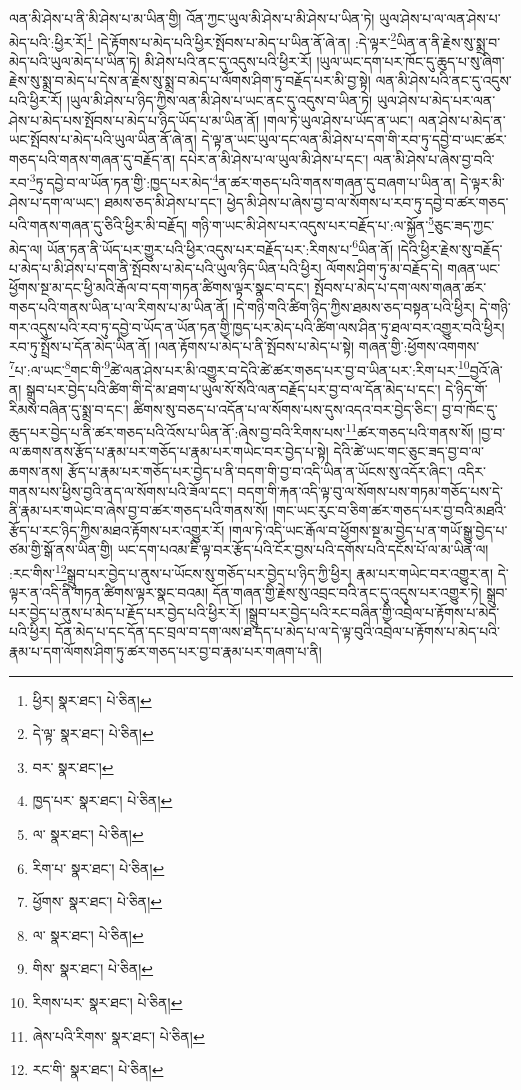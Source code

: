 ལན་མི་ཤེས་པ་ནི་མི་ཤེས་པ་མ་ཡིན་གྱི། འོན་ཀྱང་ཡུལ་མི་ཤེས་པ་མི་ཤེས་པ་ཡིན་ཏེ། ཡུལ་ཤེས་པ་ལ་ལན་ཤེས་པ་མེད་པའི་:ཕྱིར་རོ།\footnote{ཕྱིར།  སྣར་ཐང་།  པེ་ཅིན། } །དེ་རྟོགས་པ་མེད་པའི་ཕྱིར་སྤོབས་པ་མེད་པ་ཡིན་ནོ་ཞེ་ན། :དེ་ལྟར་\footnote{དེ་ལྟ་  སྣར་ཐང་།  པེ་ཅིན། }ཡིན་ན་ནི་རྗེས་སུ་སྨྲ་བ་མེད་པའི་ཡུལ་མེད་པ་ཡིན་ཏེ། མི་ཤེས་པའི་ནང་དུ་འདུས་པའི་ཕྱིར་རོ། །ཡུལ་ཡང་དག་པར་ཁོང་དུ་ཆུད་པ་སུ་ཞིག་རྗེས་སུ་སྨྲ་བ་མེད་པ་དེས་ན་རྗེས་སུ་སྨྲ་བ་མེད་པ་ལོགས་ཤིག་ཏུ་བརྗོད་པར་མི་བྱ་སྟེ། ལན་མི་ཤེས་པའི་ནང་དུ་འདུས་པའི་ཕྱིར་རོ། །ཡུལ་མི་ཤེས་པ་ཉིད་ཀྱིས་ལན་མི་ཤེས་པ་ཡང་ནང་དུ་འདུས་བ་ཡིན་ཏེ། ཡུལ་ཤེས་པ་མེད་པར་ལན་ཤེས་པ་མེད་པས་སྤོབས་པ་མེད་པ་ཉིད་ཡོད་པ་མ་ཡིན་ནོ། །གལ་ཏེ་ཡུལ་ཤེས་པ་ཡོད་ན་ཡང་། ལན་ཤེས་པ་མེད་ན་ཡང་སྤོབས་པ་མེད་པའི་ཡུལ་ཡིན་ནོ་ཞེ་ན། དེ་ལྟ་ན་ཡང་ཡུལ་དང་ལན་མི་ཤེས་པ་དག་གི་རབ་ཏུ་དབྱེ་བ་ཡང་ཚར་གཅད་པའི་གནས་གཞན་དུ་བརྗོད་ན། དཔེར་ན་མི་ཤེས་པ་ལ་ཡུལ་མི་ཤེས་པ་དང་། ལན་མི་ཤེས་པ་ཞེས་བྱ་བའི་རབ་\footnote{བར་  སྣར་ཐང་། }ཏུ་དབྱེ་བ་ལ་ཡོན་ཏན་གྱི་:ཁྱད་པར་མེད་\footnote{ཁྱད་པར་  སྣར་ཐང་།  པེ་ཅིན། }ན་ཚར་གཅད་པའི་གནས་གཞན་དུ་བཞག་པ་ཡིན་ན། དེ་ལྟར་མི་ཤེས་པ་དག་ལ་ཡང་། ཐམས་ཅད་མི་ཤེས་པ་དང་། ཕྱེད་མི་ཤེས་པ་ཞེས་བྱ་བ་ལ་སོགས་པ་རབ་ཏུ་དབྱེ་བ་ཚར་གཅད་པའི་གནས་གཞན་དུ་ཅིའི་ཕྱིར་མི་བརྗོད། གཉི་ག་ཡང་མི་ཤེས་པར་འདུས་པར་བརྗོད་པ་:ལ་སྐྱོན་\footnote{ལ་  སྣར་ཐང་།  པེ་ཅིན། }ཅུང་ཟད་ཀྱང་མེད་ལ། ཡོན་ཏན་ནི་ཡོད་པར་གྱུར་པའི་ཕྱིར་འདུས་པར་བརྗོད་པར་:རིགས་པ་\footnote{རིག་པ་  སྣར་ཐང་།  པེ་ཅིན། }ཡིན་ནོ། །དེའི་ཕྱིར་རྗེས་སུ་བརྗོད་པ་མེད་པ་མི་ཤེས་པ་དག་ནི་སྤོབས་པ་མེད་པའི་ཡུལ་ཉིད་ཡིན་པའི་ཕྱིར། ལོགས་ཤིག་ཏུ་མ་བརྗོད་དེ། གཞན་ཡང་ཕྱོགས་སྔ་མ་དང་ཕྱི་མའི་རྒོལ་བ་དག་གཏན་ཚིགས་ལྟར་སྣང་བ་དང་། སྤོབས་པ་མེད་པ་དག་ལས་གཞན་ཚར་གཅད་པའི་གནས་ཡིན་པ་ལ་རིགས་པ་མ་ཡིན་ནོ། །དེ་གཉི་གའི་ཚིག་ཉིད་ཀྱིས་ཐམས་ཅད་བསྟན་པའི་ཕྱིར། དེ་གཉི་གར་འདུས་པའི་རབ་ཏུ་དབྱེ་བ་ཡོད་ན་ཡོན་ཏན་གྱི་ཁྱད་པར་མེད་པའི་ཚིག་ལས་ཤིན་ཏུ་ཐལ་བར་འགྱུར་བའི་ཕྱིར། རབ་ཏུ་སྤྲོས་པ་དོན་མེད་ཡིན་ནོ། །ལན་རྟོགས་པ་མེད་པ་ནི་སྤོབས་པ་མེད་པ་སྟེ། གཞན་གྱི་:ཕྱོགས་འགགས་\footnote{ཕྱོགས་  སྣར་ཐང་།  པེ་ཅིན། }པ་:ལ་ཡང་\footnote{ལ་  སྣར་ཐང་།  པེ་ཅིན། }གང་གི་\footnote{གིས་  སྣར་ཐང་།  པེ་ཅིན། }ཚེ་ལན་ཤེས་པར་མི་འགྱུར་བ་དེའི་ཚེ་ཚར་གཅད་པར་བྱ་བ་ཡིན་པར་:རིག་པར་\footnote{རིགས་པར་  སྣར་ཐང་།  པེ་ཅིན། }བྱའོ་ཞེ་ན། སྒྲུབ་པར་བྱེད་པའི་ཚིག་གི་དེ་མ་ཐག་པ་ཡུལ་སོ་སོའི་ལན་བརྗོད་པར་བྱ་བ་ལ་དོན་མེད་པ་དང་། དེ་ཉིད་གོ་རིམས་བཞིན་དུ་སྨྲ་བ་དང་། ཚིགས་སུ་བཅད་པ་འདོན་པ་ལ་སོགས་པས་དུས་འདའ་བར་བྱེད་ཅིང་། བྱ་བ་ཁོང་དུ་ཆུད་པར་བྱེད་པ་ནི་ཚར་གཅད་པའི་འོས་པ་ཡིན་ནོ་:ཞེས་བྱ་བའི་རིགས་པས་\footnote{ཞེས་པའི་རིགས་  སྣར་ཐང་།  པེ་ཅིན། }ཚར་གཅད་པའི་གནས་སོ། །བྱ་བ་ལ་ཆགས་ནས་རྩོད་པ་རྣམ་པར་གཅོད་པ་རྣམ་པར་གཡེང་བར་བྱེད་པ་སྟེ། དེའི་ཚེ་ཡང་གང་ཅུང་ཟད་བྱ་བ་ལ་ཆགས་ནས། རྩོད་པ་རྣམ་པར་གཅོད་པར་བྱེད་པ་ནི་བདག་གི་བྱ་བ་འདི་ཡིན་ན་ཡོངས་སུ་འདོར་ཞིང་། འདིར་གནས་པས་ཕྱིས་བྱའི་ནད་ལ་སོགས་པའི་ཟོལ་དང་། བདག་གི་རྐན་འདི་ལྟ་བུ་ལ་སོགས་པས་གཏམ་གཅོད་པས་དེ་ནི་རྣམ་པར་གཡེང་བ་ཞེས་བྱ་བ་ཚར་གཅད་པའི་གནས་སོ། །གང་ཡང་རུང་བ་ཅིག་ཚར་གཅད་པར་བྱ་བའི་མཐའི་རྩོད་པ་རང་ཉིད་ཀྱིས་མཐའ་རྟོགས་པར་འགྱུར་རོ། །གལ་ཏེ་འདི་ཡང་རྒོལ་བ་ཕྱོགས་སྔ་མ་བྱེད་པ་ན་གཡོ་སྒྱུ་བྱེད་པ་ཙམ་གྱི་སྒོ་ནས་ཡིན་གྱི། ཡང་དག་པའམ་ཇི་ལྟ་བར་རྩོད་པའི་ངོར་བྱས་པའི་དགོས་པའི་དངོས་པོ་ལ་མ་ཡིན་ལ། :རང་གིས་\footnote{རང་གི་  སྣར་ཐང་།  པེ་ཅིན། }སྒྲུབ་པར་བྱེད་པ་ནུས་པ་ཡོངས་སུ་གཅོད་པར་བྱེད་པ་ཉིད་ཀྱི་ཕྱིར། རྣམ་པར་གཡེང་བར་འགྱུར་ན། དེ་ལྟར་ན་འདི་ནི་གཏན་ཚིགས་ལྟར་སྣང་བའམ། དོན་གཞན་གྱི་རྗེས་སུ་འབྲང་བའི་ནང་དུ་འདུས་པར་འགྱུར་ཏེ། སྒྲུབ་པར་བྱེད་པ་ནུས་པ་མེད་པ་རྗོད་པར་བྱེད་པའི་ཕྱིར་རོ། །སྒྲུབ་པར་བྱེད་པའི་རང་བཞིན་གྱི་འབྲེལ་པ་རྟོགས་པ་མེད་པའི་ཕྱིར། དོན་མེད་པ་དང་དོན་དང་བྲལ་བ་དག་ལས་ཐ་དད་པ་མེད་པ་ལ་དེ་ལྟ་བུའི་འབྲེལ་པ་རྟོགས་པ་མེད་པའི་རྣམ་པ་དག་ལོགས་ཤིག་ཏུ་ཚར་གཅད་པར་བྱ་བ་རྣམ་པར་གཞག་པ་ནི། 